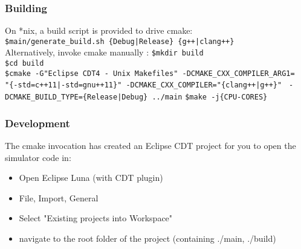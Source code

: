 \subsubsection{Building}
On *nix, a build script is provided to drive cmake:\\
\lstinline!$main/generate_build.sh {Debug|Release} {g++|clang++}!\\
Alternatively, invoke cmake manually :
\lstinline!$mkdir build!\\
\lstinline!$cd build!\\
\lstinline!$cmake -G"Eclipse CDT4 - Unix Makefiles" -DCMAKE_CXX_COMPILER_ARG1=!\\
\lstinline!"{-std=c++11|-std=gnu++11}" -DCMAKE_CXX_COMPILER="{clang++|g++}" !
\lstinline!-DCMAKE_BUILD_TYPE={Release|Debug} ../main!
\lstinline!$make -j{CPU-CORES}!\\
\subsubsection{Development}
The cmake invocation has created an Eclipse CDT project for you to open the simulator code in:
\begin{itemize}
  \item Open Eclipse Luna (with CDT plugin)
  \item File, Import, General
  \item Select "Existing projects into Workspace"
  \item navigate to the root folder of the project (containing ./main, ./build)
\end{itemize}
